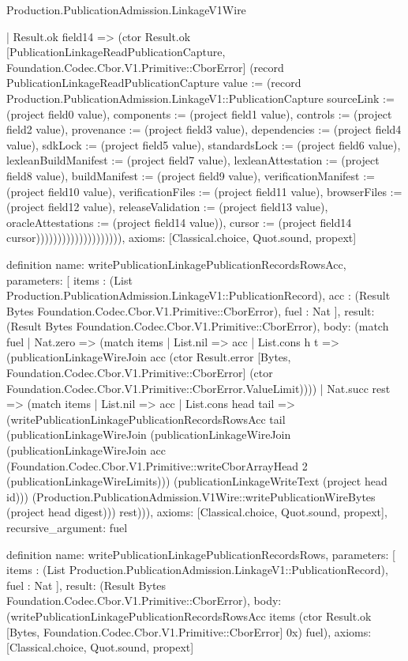\begin{lexlean}{Production.PublicationAdmission.LinkageV1Wire}
\begin{semanticmodule}
{                                    | Result.ok field14 => (ctor Result.ok [PublicationLinkageReadPublicationCapture, Foundation.Codec.Cbor.V1.Primitive::CborError] (record PublicationLinkageReadPublicationCapture {value := (record Production.PublicationAdmission.LinkageV1::PublicationCapture {sourceLink := (project field0 value), components := (project field1 value), controls := (project field2 value), provenance := (project field3 value), dependencies := (project field4 value), sdkLock := (project field5 value), standardsLock := (project field6 value), lexleanBuildManifest := (project field7 value), lexleanAttestation := (project field8 value), buildManifest := (project field9 value), verificationManifest := (project field10 value), verificationFiles := (project field11 value), browserFiles := (project field12 value), releaseValidation := (project field13 value), oracleAttestations := (project field14 value)}), cursor := (project field14 cursor)}))))))))))))))))))),
  axioms: [Classical.choice, Quot.sound, propext]
}

definition{
  name: writePublicationLinkagePublicationRecordsRowsAcc,
  parameters: [
    items : (List Production.PublicationAdmission.LinkageV1::PublicationRecord),
    acc : (Result Bytes Foundation.Codec.Cbor.V1.Primitive::CborError),
    fuel : Nat
  ],
  result: (Result Bytes Foundation.Codec.Cbor.V1.Primitive::CborError),
  body: (match fuel
    | Nat.zero => (match items
      | List.nil => acc
      | List.cons h t => (publicationLinkageWireJoin acc (ctor Result.error [Bytes, Foundation.Codec.Cbor.V1.Primitive::CborError] (ctor Foundation.Codec.Cbor.V1.Primitive::CborError.ValueLimit))))
    | Nat.succ rest => (match items
      | List.nil => acc
      | List.cons head tail => (writePublicationLinkagePublicationRecordsRowsAcc tail (publicationLinkageWireJoin (publicationLinkageWireJoin (publicationLinkageWireJoin acc (Foundation.Codec.Cbor.V1.Primitive::writeCborArrayHead 2 (publicationLinkageWireLimits))) (publicationLinkageWriteText (project head id))) (Production.PublicationAdmission.V1Wire::writePublicationWireBytes (project head digest))) rest))),
  axioms: [Classical.choice, Quot.sound, propext],
  recursive_argument: fuel
}

definition{
  name: writePublicationLinkagePublicationRecordsRows,
  parameters: [
    items : (List Production.PublicationAdmission.LinkageV1::PublicationRecord),
    fuel : Nat
  ],
  result: (Result Bytes Foundation.Codec.Cbor.V1.Primitive::CborError),
  body: (writePublicationLinkagePublicationRecordsRowsAcc items (ctor Result.ok [Bytes, Foundation.Codec.Cbor.V1.Primitive::CborError] 0x) fuel),
  axioms: [Classical.choice, Quot.sound, propext]
}


\end{semanticmodule}
\end{lexlean}
